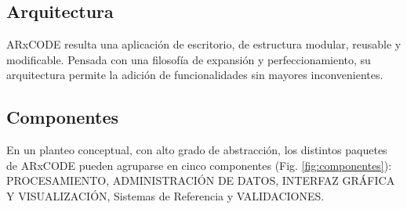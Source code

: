\subsection{Arquitectura}
ARxCODE resulta una aplicaci\'on de escritorio, de estructura modular, reusable y modificable. Pensada con una filosof\'ia de expansi\'on y perfeccionamiento, su arquitectura permite la adici\'on de funcionalidades sin mayores inconvenientes.\\


\subsection*{Componentes}\label{subsec:componentes}
En un planteo conceptual, con alto grado de abstracci\'on, los distintos paquetes de ARxCODE pueden agruparse en cinco componentes (Fig.  \ref{fig:componentes}): PROCESAMIENTO, ADMINISTRACI\'ON DE DATOS, INTERFAZ GR\'AFICA Y VISUALIZACI\'ON, Sistemas de Referencia y VALIDACIONES.

